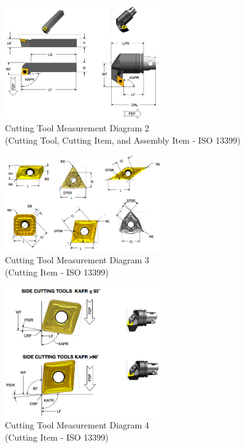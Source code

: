 \documentclass{mtconnect}	%
\begin{document}
\begin{figure}[ht]
  \centering
  \includegraphics[width=0.6\textwidth]{figures/a2-cutting-tool-measurement-diagram-4.png}
  \caption{Cutting Tool Measurement Diagram 2
  \\  (Cutting Tool, Cutting Item, and Assembly Item - ISO 13399)}
  \label{fig:a2-cutting-tool-measurement-diagram-4}
\end{figure}
\FloatBarrier


\begin{figure}[ht]
  \centering
  \includegraphics[width=0.6\textwidth]{figures/a3-cutting-item-measurement-diagram-3.png}
  \caption{Cutting Tool Measurement Diagram 3
  \\  (Cutting Item - ISO 13399)}
  \label{fig:a3-cutting-item-measurement-diagram-3}
\end{figure}
\FloatBarrier

\begin{figure}[ht]
  \centering
  \includegraphics[width=0.6\textwidth]{figures/a4-cutting-item-measurement-diagram-4.png}
  \caption{Cutting Tool Measurement Diagram 4
  \\  (Cutting Item - ISO 13399)}
  \label{fig:a4-cutting-item-measurement-diagram-4}
\end{figure}
\FloatBarrier
\end{document}
